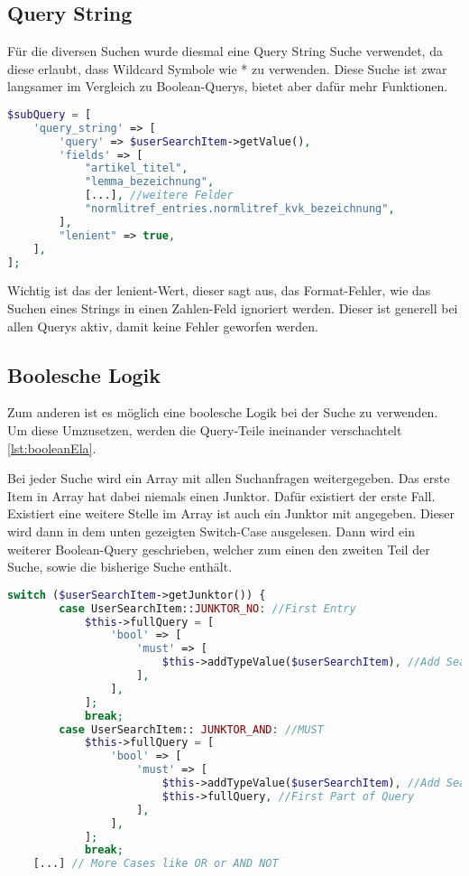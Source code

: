 \subsection{Query String}
Für die diversen Suchen wurde diesmal eine Query String Suche verwendet, da diese erlaubt, dass Wildcard Symbole wie * zu verwenden. Diese Suche ist zwar langsamer im Vergleich zu Boolean-Querys, bietet aber dafür mehr Funktionen.

\begin{lstlisting}[language=PHP, frame=single, label={lst:aufbauQueryString}] 
$subQuery = [
    'query_string' => [
        'query' => $userSearchItem->getValue(),
        'fields' => [
            "artikel_titel",
            "lemma_bezeichnung",
            [...], //weitere Felder
            "normlitref_entries.normlitref_kvk_bezeichnung",
        ],
        "lenient" => true,
    ],
];
\end{lstlisting}

Wichtig ist das der lenient-Wert, dieser sagt aus, das Format-Fehler, wie das Suchen eines Strings in einen Zahlen-Feld ignoriert werden. Dieser ist generell bei allen Querys aktiv, damit keine Fehler geworfen werden.


\subsection{Boolesche Logik}

Zum anderen ist es möglich eine boolesche Logik bei der Suche zu verwenden. Um diese Umzusetzen, werden die Query-Teile ineinander verschachtelt \ref{lst:booleanEla}. 

Bei jeder Suche wird ein Array mit allen Suchanfragen weitergegeben. Das erste Item in Array hat dabei niemals einen Junktor. Dafür existiert der erste Fall. Existiert eine weitere Stelle im Array ist auch ein Junktor mit angegeben. Dieser wird dann in dem unten gezeigten Switch-Case ausgelesen. Dann wird ein weiterer Boolean-Query geschrieben, welcher zum einen den zweiten Teil der Suche, sowie die bisherige Suche enthält.

\begin{lstlisting}[language=PHP, frame=single, label={lst:booleanEla}] 
    switch ($userSearchItem->getJunktor()) {
        case UserSearchItem::JUNKTOR_NO: //First Entry
            $this->fullQuery = [
                'bool' => [
                    'must' => [
                        $this->addTypeValue($userSearchItem), //Add Search
                    ],
                ],
            ];
            break;
        case UserSearchItem:: JUNKTOR_AND: //MUST
            $this->fullQuery = [
                'bool' => [
                    'must' => [
                        $this->addTypeValue($userSearchItem), //Add Search
                        $this->fullQuery, //First Part of Query
                    ],
                ],
            ];
            break;
    [...] // More Cases like OR or AND NOT
\end{lstlisting}

